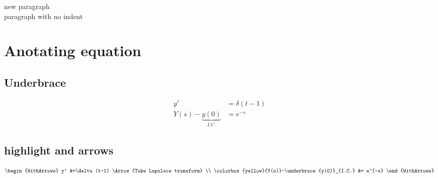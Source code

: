 \documentclass{article}
\begin{document}
new paragraph\\

\noindent paragraph with no indent
\vfill
\lipsum[1]

\newpage

\section{Anotating equation}
\subsection{Underbrace}
\begin{align}
    y' &=\delta(t-1) \\
    Y(s)-\underbrace{y(0)}_{I.C.} &= e^{-s}
\end{align}

\subsection{highlight and arrows }

\[\begin{WithArrows}
    y' &=\delta(t-1) \Arrow{Take Lapalace transform} \\
    \colorbox{yellow}{Y(s)}-\underbrace{y(0)}_{I.C.} &= e^{-s}
\end{WithArrows}\]

\end{document}
